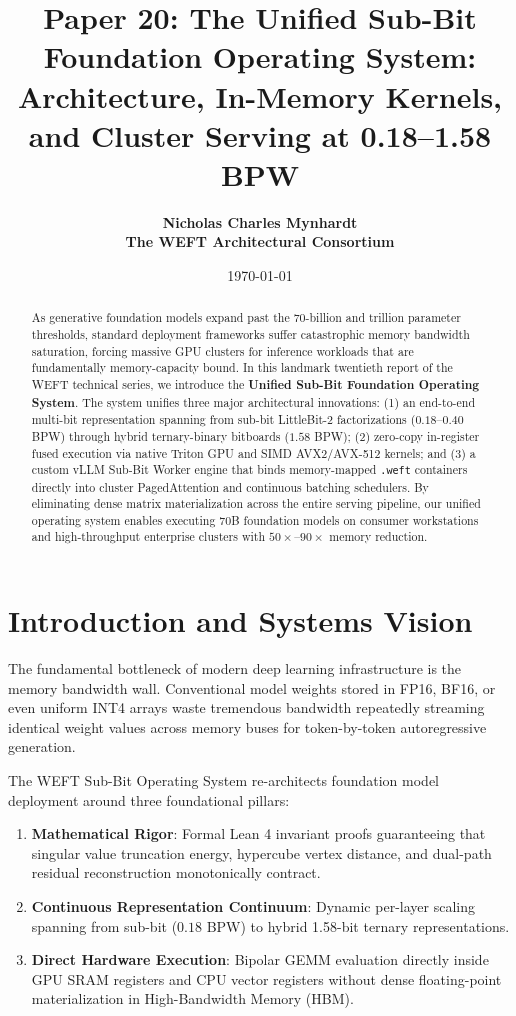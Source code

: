 \documentclass[11pt,a4paper]{article}
\title{\textbf{Paper 20: The Unified Sub-Bit Foundation Operating System: Architecture, In-Memory Kernels, and Cluster Serving at 0.18–1.58 BPW}}
\author{
  \textbf{Nicholas Charles Mynhardt} \\
  \textbf{The WEFT Architectural Consortium}
}
\date{\today}
\begin{document}
\maketitle

\begin{abstract}
As generative foundation models expand past the 70-billion and trillion parameter thresholds, standard deployment frameworks suffer catastrophic memory bandwidth saturation, forcing massive GPU clusters for inference workloads that are fundamentally memory-capacity bound. In this landmark twentieth report of the WEFT technical series, we introduce the \textbf{Unified Sub-Bit Foundation Operating System}. The system unifies three major architectural innovations: (1) an end-to-end multi-bit representation spanning from sub-bit LittleBit-2 factorizations ($0.18$–$0.40$ BPW) through hybrid ternary-binary bitboards ($1.58$ BPW); (2) zero-copy in-register fused execution via native Triton GPU and SIMD AVX2/AVX-512 kernels; and (3) a custom vLLM Sub-Bit Worker engine that binds memory-mapped \texttt{.weft} containers directly into cluster PagedAttention and continuous batching schedulers. By eliminating dense matrix materialization across the entire serving pipeline, our unified operating system enables executing 70B foundation models on consumer workstations and high-throughput enterprise clusters with $50\times$–$90\times$ memory reduction.
\end{abstract}

\section{Introduction and Systems Vision}
The fundamental bottleneck of modern deep learning infrastructure is the memory bandwidth wall. Conventional model weights stored in FP16, BF16, or even uniform INT4 arrays waste tremendous bandwidth repeatedly streaming identical weight values across memory buses for token-by-token autoregressive generation.

The WEFT Sub-Bit Operating System re-architects foundation model deployment around three foundational pillars:
\begin{enumerate}
    \item \textbf{Mathematical Rigor}: Formal Lean 4 invariant proofs guaranteeing that singular value truncation energy, hypercube vertex distance, and dual-path residual reconstruction monotonically contract.
    \item \textbf{Continuous Representation Continuum}: Dynamic per-layer scaling spanning from sub-bit ($0.18$ BPW) to hybrid 1.58-bit ternary representations.
    \item \textbf{Direct Hardware Execution}: Bipolar GEMM evaluation directly inside GPU SRAM registers and CPU vector registers without dense floating-point materialization in High-Bandwidth Memory (HBM).
\end{enumerate}
\end{document}
